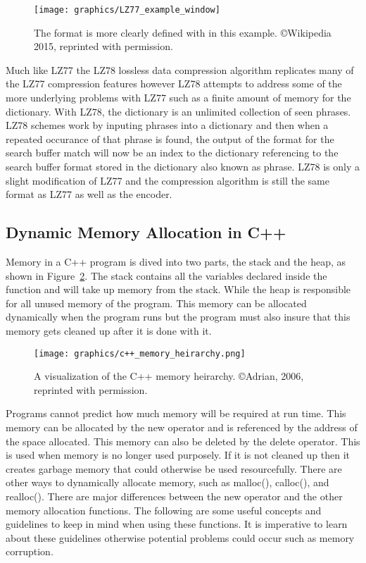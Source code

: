 \documentclass[letterpaper, 11pt]{article}
\begin{document}
\begin{figure}
  \centering
  \texttt{[image: graphics/LZ77\_example\_window]}
  \caption{The format is more clearly defined with in this example. \copyright Wikipedia 2015, reprinted with permission.\cite{LZ77_78}}
  \label{fig:lz77_format}
\end{figure}

Much like LZ77 the LZ78 lossless data compression algorithm replicates many of the LZ77 compression features however
LZ78 attempts to address some of the more underlying problems with LZ77 such as a finite amount of memory for
the dictionary. With LZ78, the dictionary is an unlimited collection of seen phrases. LZ78 schemes work by inputing
phrases into a dictionary and then when a repeated occurance of that phrase is found, the output of the format for
the search buffer match will now be an index to the dictionary referencing to the search buffer format stored in
the dictionary also known as phrase. LZ78 is only a slight modification of LZ77 and the compression algorithm is still
the same format as LZ77 as well as the encoder.

\newpage

\subsection{Dynamic Memory Allocation in C++}
Memory in a C++ program is dived into two parts, the stack and the heap, as shown in Figure~\ref{fig:cpp_mem_heirarchy}. The stack contains all the 
variables declared inside the function and will take up memory from the stack. While the heap is responsible 
for all unused memory of the program. This memory can be allocated dynamically when the program runs but 
the program must also insure that this memory gets cleaned up after it is done with it.
\par\vspace{\baselineskip}

\begin{figure}
  \centering
  \texttt{[image: graphics/c++\_memory\_heirarchy.png]}
  \caption{A visualization of the C++ memory heirarchy. \copyright Adrian, 2006, reprinted with permission. \cite{stackheap}}
  \label{fig:cpp_mem_heirarchy}
\end{figure}

Programs cannot predict how much memory will be required at run time. This memory can be allocated 
by the new operator and is referenced by the address of the space allocated. This memory can 
also be deleted by the delete operator. This is used when memory is no longer used purposely. 
If it is not cleaned up then it creates garbage memory that could otherwise be used resourcefully. 
There are other ways to dynamically allocate memory, such as malloc(), calloc(), and realloc(). 
There are major differences between the new operator and the other memory allocation functions.  
The following are some useful concepts and guidelines to keep in mind when using these functions. 
It is imperative to learn about these guidelines otherwise potential problems could occur 
such as memory corruption. \cite{newerror}
\end{document}
